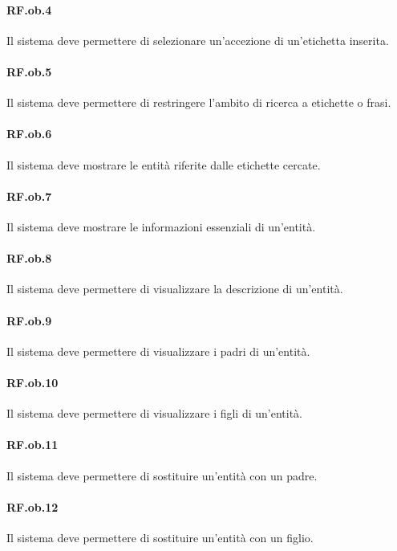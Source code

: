 \documentclass[10pt,a4paper,headinclude,footinclude,hidelinks]{scrreprt} %
\begin{document}
	\paragraph{RF.ob.4} Il sistema deve permettere di selezionare un'accezione di un'etichetta inserita.

	\paragraph{RF.ob.5} Il sistema deve permettere di restringere l'ambito di ricerca a etichette o frasi.

	\paragraph{RF.ob.6} Il sistema deve mostrare le entità riferite dalle etichette cercate.

	\paragraph{RF.ob.7} Il sistema deve mostrare le informazioni essenziali di un'entità.

	\paragraph{RF.ob.8} Il sistema deve permettere di visualizzare la descrizione di un'entità.

	\paragraph{RF.ob.9} Il sistema deve permettere di visualizzare i padri di un'entità.

	\paragraph{RF.ob.10} Il sistema deve permettere di visualizzare i figli di un'entità.

	\paragraph{RF.ob.11} Il sistema deve permettere di sostituire un'entità con un padre.

	\paragraph{RF.ob.12} Il sistema deve permettere di sostituire un'entità con un figlio.
\end{document}
